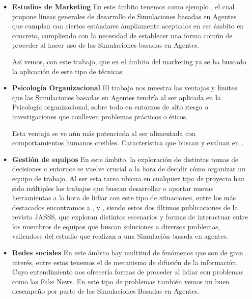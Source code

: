 \begin{itemize}
	\item \textbf{Estudios  de Marketing} En este ámbito tenemos como ejemplo \cite{rand2011agent}, el cual propone líneas generales de desarrollo de Simulaciones basadas en Agentes que cumplan con ciertos estándares ámpliamente aceptados en ese ámbito en concreto, cumpliendo con la necesidad de establecer una forma común de proceder al hacer uso de las Simulaciones basadas en Agentes.

Así vemos, con este trabajo, que en el ámbito del marketing ya se ha buscado la aplicación de este tipo de técnicas.
	\item \textbf{Psicología Organizacional} El trabajo \cite{hughes2012agent} nos muestra las ventajas y límites que las Simulaciones basadas en Agentes tendría al ser aplicada en la Psicología organizacional, sobre todo en entornos de alto riesgo o investigaciones que conlleven problemas prácticos o éticos.

Esta ventaja se ve aún más potenciada al ser alimentada con comportamientos humanos creibles. Característica que buscan y evaluan en \cite{park2023generative}.
	\item \textbf{Gestión de equipos} En este ámbito, la exploración de distintas tomas de decisiones o entornos se vuelve crucial a la hora de decidir cómo organizar un equipo de trabajo. Al ser esta tarea ubicua en cualquier tipo de proyecto han sido múltiples los trabajos que buscan desarrollar o aportar nuevas herramientas a la hora de lidiar con este tipo de situaciones, entre los más destacados encontramos a \cite{crowder2012development}, \cite{boroomand2021hard} y \cite{boroomand2023superiority}, siendo estos dos últimos publicaciones de la revista JASSS, que exploran distintos escenarios y formas de interactuar entre los miembros de equipos que buscan soluciones a diversos problemas, valiendose del estudio que realizan a una Simulación basada en agentes.
	\item \textbf{Redes sociales} En este ámbito hay multitud de fenómenos que son de gran interés, entre estos tenemos el de mecanismo de difusión de la información. Cuyo entendimiento nos ofrecería formas de proceder al lidiar con problemas como las Fake News. En este tipo de problemas también vemos un buen desempeño por parte de las Simulaciones Basadas en Agentes.


\end{itemize}
